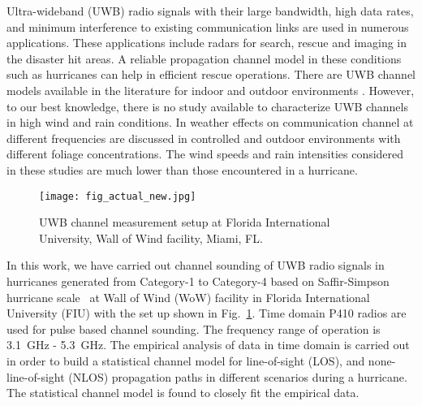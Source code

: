 \documentclass[conference]{IEEEtran}
\begin{document}
Ultra-wideband (UWB) radio signals with their large bandwidth, high data rates, and minimum interference to existing communication links are used in numerous applications. These applications include radars for search, rescue and imaging in the disaster hit areas. A reliable propagation channel model in these conditions such as hurricanes can help in efficient rescue operations. There are UWB channel models available in the literature for indoor and outdoor environments \cite{intel_uwb, molisch00}. However, to our best knowledge, there is no study available to characterize UWB channels in high wind and rain conditions. In \cite{uwb4,uwb6,uwb7,Weather_new1,Weather_new3,Weather_new4} weather effects on communication channel at different frequencies are discussed in controlled and outdoor environments with different foliage concentrations. The wind speeds and rain intensities considered in these studies are much lower than those encountered in a hurricane. 
   
\begin{figure}[!t]
	\centering
	\texttt{[image: fig\_actual\_new.jpg]}
	\caption{UWB channel measurement setup at Florida International University, Wall of Wind facility, Miami, FL.}\label{Fig:fig_actual}
\vspace{-0.4 cm}
\end{figure}


In this work, we have carried out channel sounding of UWB radio signals in hurricanes generated from Category-1 to Category-4 based on Saffir-Simpson hurricane scale~\cite{SaffirSimpson} at Wall of Wind (WoW) facility in Florida International University (FIU) with the set up shown in Fig.~\ref{Fig:fig_actual}. Time domain P410 radios are used for pulse based channel sounding. The frequency range of operation is 3.1~GHz - 5.3~GHz. The empirical analysis of data in time domain is carried out in order to build a statistical channel model for line-of-sight (LOS), and none-line-of-sight (NLOS) propagation paths in different scenarios during a hurricane. The statistical channel model is found to closely fit the empirical data. 

      
\end{document}
